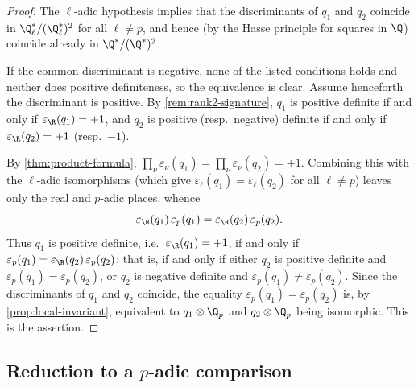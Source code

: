 \begin{proof}
  The \(\ell\)-adic hypothesis implies that the discriminants of \(q_1\) and
  \(q_2\) coincide in \(\Q_\ell^*/(\Q_\ell^*)^2\) for all \(\ell \neq p\), and
  hence (by the Hasse principle for squares in \(\Q\)) coincide already in
  \(\Q^*/(\Q^*)^2\).

  If the common discriminant is negative, none of the listed conditions holds
  and neither does positive definiteness, so the equivalence is clear. Assume
  henceforth the discriminant is positive. By \cref{rem:rank2-signature},
  \(q_1\) is positive definite if and only if \(\varepsilon_\R(q_1) = +1\), and
  \(q_2\) is positive (resp.\ negative) definite if and only if
  \(\varepsilon_\R(q_2) = +1\) (resp.\ \(-1\)).

  By \cref{thm:product-formula},
  \(\prod_\nu \varepsilon_\nu(q_1) = \prod_\nu \varepsilon_\nu(q_2) = +1\).
  Combining this with the \(\ell\)-adic isomorphisms (which give
  \(\varepsilon_\ell(q_1) = \varepsilon_\ell(q_2)\) for all \(\ell \neq p\))
  leaves only the real and \(p\)-adic places, whence
  \[\varepsilon_\R(q_1)\,\varepsilon_p(q_1)
    = \varepsilon_\R(q_2)\,\varepsilon_p(q_2).\]
  Thus \(q_1\) is positive definite, i.e.\ \(\varepsilon_\R(q_1) = +1\), if and
  only if \(\varepsilon_p(q_1) = \varepsilon_\R(q_2)\,\varepsilon_p(q_2)\); that
  is, if and only if either \(q_2\) is positive definite and
  \(\varepsilon_p(q_1) = \varepsilon_p(q_2)\), or \(q_2\) is negative definite
  and \(\varepsilon_p(q_1) \neq \varepsilon_p(q_2)\). Since the discriminants of
  \(q_1\) and \(q_2\) coincide, the equality
  \(\varepsilon_p(q_1) = \varepsilon_p(q_2)\) is, by
  \cref{prop:local-invariant}, equivalent to \(q_1 \otimes \Q_p\) and
  \(q_2 \otimes \Q_p\) being isomorphic. This is the assertion.
\end{proof}

\subsection*{Reduction to a $p$-adic comparison}

